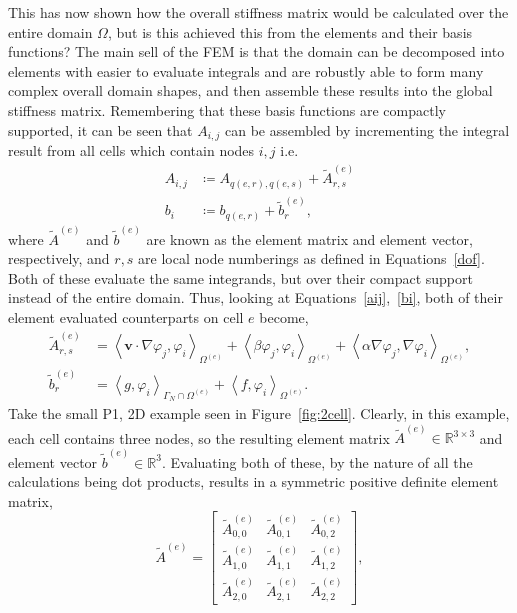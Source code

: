 This has now shown how the overall stiffness matrix would be calculated over the entire domain $\Omega$, but is this achieved this from the elements and their basis functions? The main sell of the FEM is that the domain can be decomposed into elements with easier to evaluate integrals and are robustly able to form many complex overall domain shapes, and then assemble these results into the global stiffness matrix. Remembering that these basis functions are compactly supported, it can be seen that $A_{i,j}$ can be assembled by incrementing the integral result from all cells which contain nodes $i,j$  i.e.
\begin{align}
	A_{i,j} &\coloneqq A_{q(e,r),q(e,s)} + \widetilde{A}_{r,s}^{(e)} \label{aij}\\
	b_i &\coloneqq b_{q(e,r)} + \widetilde{b}_r^{(e)},				\label{bi}
\end{align}
where $\widetilde{A}^{(e)}$ and $\widetilde{b}^{(e)}$ are known as the element matrix and element vector, respectively, and $r,s$ are local node numberings as defined in Equations~\eqref{dof}. Both of these evaluate the same integrands, but over their compact support instead of the entire domain. Thus, looking at Equations~\eqref{aij},~\eqref{bi}, both of their element evaluated counterparts on cell $e$ become,
\begin{align}
	\widetilde{A}_{r,s}^{(e)} &= \left\langle\mathbf{v}\cdot\nabla \varphi_j,\varphi_i\right\rangle_{\Omega^{(e)}} + \left\langle\beta \varphi_j,\varphi_i\right\rangle_{\Omega^{(e)}} + \left\langle\alpha\nabla \varphi_j, \nabla \varphi_i\right\rangle_{\Omega^{(e)}}, \\
	\widetilde{b}_r^{(e)} &= \left\langle g,\varphi_i\right\rangle_{\Gamma_N\cap\Omega^{(e)}} + \left\langle f,\varphi_i\right\rangle_{\Omega^{(e)}}.
\end{align}
Take the small P1, 2D example seen in Figure~\ref{fig:2cell}. Clearly, in this example, each cell contains three nodes, so the resulting element matrix $\widetilde{A}^{(e)} \in \mathbb{R}^{3\times 3}$ and element vector $\widetilde{b}^{(e)} \in \mathbb{R}^3$. Evaluating both of these, by the nature of all the calculations being dot products, results in a symmetric positive definite element matrix,
\begin{equation}\label{elemmat}
	\widetilde{A}^{(e)} =
	\left[\begin{matrix} 
		\widetilde{A}^{(e)}_{0,0} & \widetilde{A}^{(e)}_{0,1} & \widetilde{A}^{(e)}_{0,2} \\
		\widetilde{A}^{(e)}_{1,0} & \widetilde{A}^{(e)}_{1,1} & \widetilde{A}^{(e)}_{1,2} \\
		\widetilde{A}^{(e)}_{2,0} & \widetilde{A}^{(e)}_{2,1} & \widetilde{A}^{(e)}_{2,2}
	\end{matrix}\right],
\end{equation}
